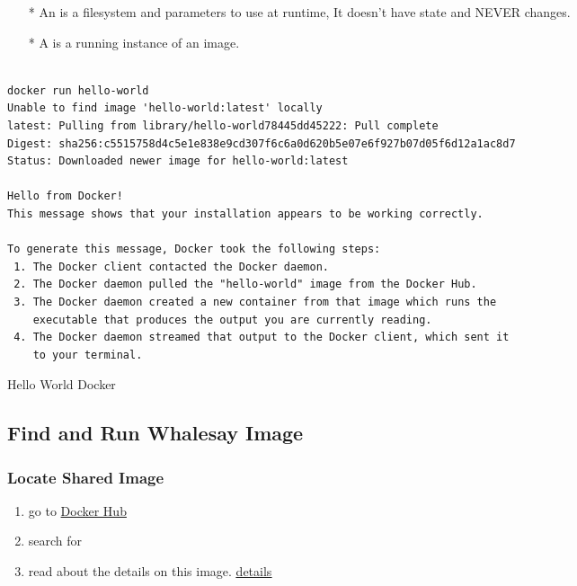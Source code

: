 \documentclass[12pt,a4paper]{article}
\begin{document}
\begin{itemize}
  \item[*] An {\color{red}{Image}} is a filesystem and parameters to use at runtime, It doesn't have state and NEVER changes.
  \item[*] A {\color{red}{container}} is a running instance of an image.
\end{itemize}

\begin{listing}[ht]
 \begin{verbatim}

docker run hello-world
Unable to find image 'hello-world:latest' locally
latest: Pulling from library/hello-world78445dd45222: Pull complete
Digest: sha256:c5515758d4c5e1e838e9cd307f6c6a0d620b5e07e6f927b07d05f6d12a1ac8d7
Status: Downloaded newer image for hello-world:latest

Hello from Docker!
This message shows that your installation appears to be working correctly.

To generate this message, Docker took the following steps:
 1. The Docker client contacted the Docker daemon.
 2. The Docker daemon pulled the "hello-world" image from the Docker Hub.
 3. The Docker daemon created a new container from that image which runs the
    executable that produces the output you are currently reading.
 4. The Docker daemon streamed that output to the Docker client, which sent it
    to your terminal.
\end{verbatim}
\label{code:2}
\caption{Hello World Docker}
 \end{listing}
\FloatBarrier

\newpage


\subsection{Find and Run Whalesay Image}

\subsubsection{Locate Shared Image}
\begin{enumerate}
  \item go to \href{https://hub.docker.com}{Docker Hub}
  \item search for {}
  \item read about the details on this image. \href{https://hub.docker.com/r/docker/whalesay/}{\underline{details}}
\end{enumerate}
\end{document}
